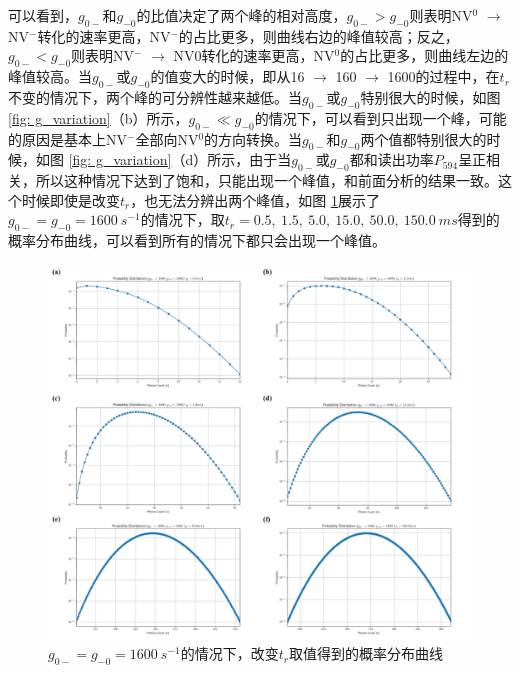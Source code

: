 \documentclass[type = bachelor]{whu-thesis}
\begin{document}
可以看到，$g_{0-}$和$g_{-0}$的比值决定了两个峰的相对高度，$g_{0-}>g_{-0}$则表明NV$^0$ $\rightarrow$ NV$^-$转化的速率更高，NV$^-$的占比更多，则曲线右边的峰值较高；反之，$g_{0-}<g_{-0}$则表明NV$^-$ $\rightarrow$ NV$0$转化的速率更高，NV$^0$的占比更多，则曲线左边的峰值较高。当$g_{0-}$或$g_{-0}$的值变大的时候，即从16 $\rightarrow$ 160 $\rightarrow$ 1600的过程中，在$t_r$不变的情况下，两个峰的可分辨性越来越低。当$g_{0-}$或$g_{-0}$特别很大的时候，如图 \ref{fig: g_variation}（b）所示，$g_{0-}\ll g_{-0}$的情况下，可以看到只出现一个峰，可能的原因是基本上NV$^-$全部向NV$^0$的方向转换。当$g_{0-}$和$g_{-0}$两个值都特别很大的时候，如图 \ref{fig: g_variation}（d）所示，由于当$g_{0-}$或$g_{-0}$都和读出功率$P_{594}$呈正相关，所以这种情况下达到了饱和，只能出现一个峰值，和前面分析的结果一致。这个时候即使是改变$t_r$，也无法分辨出两个峰值，如图 \ref{fig: g_large_tR_variation}展示了$g_{0-} = g_{-0} = 1600\ s^{-1}$的情况下，取$t_r = 0.5,\ 1.5,\ 5.0,\ 15.0,\ 50.0,\ 150.0\ ms$得到的概率分布曲线，可以看到所有的情况下都只会出现一个峰值。
\begin{figure}
  \centering
  \includegraphics[width=1.0\textwidth]{figures/Chapter 5/g_large_tR_variation.png}
  \caption[$g_{0-} = g_{-0} = 1600\ s^{-1}$的情况下，改变$t_r$取值得到的概率分布曲线]{$g_{0-} = g_{-0} = 1600\ s^{-1}$的情况下，改变$t_r$取值得到的概率分布曲线}
  \label{fig: g_large_tR_variation}
\end{figure}
\end{document}
